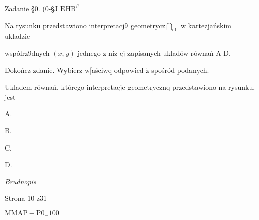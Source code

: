 \documentclass[a4paper,12pt]{article}
\begin{document}
Zadanie \S 0. (0-\S J $\mathrm{E}\mathrm{H}\mathrm{B}^{\beta}$

Na rysunku przedstawiono interpretacj9 $\displaystyle \mathrm{g}\mathrm{e}\mathrm{o}\mathrm{m}\mathrm{e}\mathrm{t}\mathrm{r}\mathrm{y}\mathrm{c}\mathrm{z}\bigcap_{\mathrm{c}1}$ w kartezjańskim ukladzie

wspólrz9dnych $(x,y)$ jednego z $\mathrm{n}\mathrm{i}\dot{\mathrm{z}}$ ej zapisanych ukladów równań A-D.

Dokończ zdanie. Wybierz w[aściwq odpowied $\acute{\mathrm{z}}$ spośród podanych.

Ukladem równań, którego interpretacje geometrycznq przedstawiono na rysunku, jest

A. 

B. 

C. 

D. 

{\it Brudnopis}

Strona 10 z31

$\mathrm{M}\mathrm{M}\mathrm{A}\mathrm{P}-\mathrm{P}0_{-}100$
\end{document}
